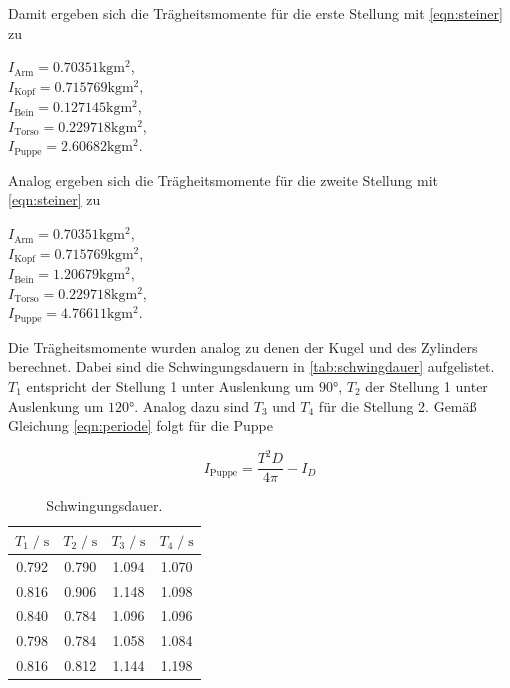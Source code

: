 Damit ergeben sich die Trägheitsmomente für die erste Stellung  mit \autoref{eqn:steiner} zu
\begin{center}
  $I_{\text{Arm}} = 0.70351 \si{\kilogram\meter^2}$, \\
  $I_{\text{Kopf}} = 0.715769 \si{\kilogram\meter^2}$, \\
  $I_{\text{Bein}} = 0.127145 \si{\kilogram\meter^2}$, \\
  $I_{\text{Torso}} = 0.229718 \si{\kilogram\meter^2}$, \\
  $I_{\text{Puppe}} = 2.60682 \si{\kilogram\meter^2}$. \\
\end{center}
Analog ergeben sich die Trägheitsmomente für die zweite Stellung mit \autoref{eqn:steiner} zu
\begin{center}
  $I_{\text{Arm}} = 0.70351 \si{\kilogram\meter^2}$, \\
  $I_{\text{Kopf}} = 0.715769 \si{\kilogram\meter^2}$, \\
  $I_{\text{Bein}} = 1.20679 \si{\kilogram\meter^2}$, \\ 
  $I_{\text{Torso}} = 0.229718 \si{\kilogram\meter^2}$, \\
  $I_{\text{Puppe}} = 4.76611 \si{\kilogram\meter^2}$. \\
\end{center}


Die Trägheitsmomente wurden analog zu denen der Kugel und des Zylinders berechnet. Dabei sind die Schwingungsdauern in \autoref{tab:schwingdauer}
aufgelistet.
$T_1$ entspricht der Stellung 1 unter Auslenkung um $90°$, $T_2$ der Stellung 1 unter Auslenkung um $120°$.
Analog dazu sind $T_3$ und $T_4$ für die Stellung 2. Gemäß Gleichung \autoref{eqn:periode} folgt für die Puppe


\begin{equation*}
  I_{\text{Puppe}} = \frac{T^2D}{4\pi} - I_D
\end{equation*}

\begin{table}[H]
    \centering
        \caption{Schwingungsdauer.}
        \label{tab:schwingdauer}
        \begin{tabular}{c c c c}
        \toprule
        $T_1 \;/\; \si{\second}$ & $T_2 \;/\; \si{\second}$ & $T_3 \;/\; \si{\second}$ & $T_4 \;/\; \si{\second}$ \\
        \midrule
        0.792 & 0.790 & 1.094 & 1.070 \\
        0.816 & 0.906 & 1.148 & 1.098 \\
        0.840 & 0.784 & 1.096 & 1.096 \\
        0.798 & 0.784 & 1.058 & 1.084 \\
        0.816 & 0.812 & 1.144 & 1.198 \\
        \bottomrule
    \end{tabular}
\end{table}


